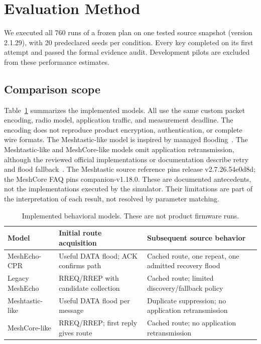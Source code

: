 \section{Evaluation Method}
\label{sec:evaluation}

We executed all 760 runs of a frozen plan on one tested source snapshot
(version 2.1.29), with 20 predeclared seeds per condition. Every key
completed on its first attempt and passed the formal evidence audit.
Development pilots are excluded from these performance estimates.

\subsection{Comparison scope}

Table~\ref{tab:models} summarizes the implemented models. All use the
same custom packet encoding, radio model, application traffic, and
measurement deadline. The encoding does not reproduce product encryption,
authentication, or complete wire formats. The Meshtastic-like model is
inspired by managed flooding~\cite{meshtasticdocs}. The Meshtastic-like and
MeshCore-like models omit application retransmission, although the
reviewed official implementations or documentation describe retry and
flood fallback~\cite{meshtasticfirmware,meshcore}. The Meshtastic source
reference pins release v2.7.26.54e0d8d; the MeshCore FAQ pins companion-v1.18.0.
These are documented antecedents, not the implementations executed by
the simulator. Their limitations are part
of the interpretation of each result, not resolved by parameter matching.

\begin{table}[t]
\caption{Implemented behavioral models. These are not product firmware runs.}
\label{tab:models}
\centering
\small
\setlength{\tabcolsep}{3pt}
\begin{tabular}{@{}>{\raggedright\arraybackslash}p{}>{\raggedright\arraybackslash}p{}>{\raggedright\arraybackslash}p{}@{}}
\toprule
Model & Initial route acquisition & Subsequent source behavior \\
\midrule
MeshEcho-CPR & Useful DATA flood; ACK confirms path & Cached route, one repeat, one admitted recovery flood \\
Legacy MeshEcho & RREQ/RREP with candidate collection & Cached route; limited discovery/fallback policy \\
Meshtastic-like & Useful DATA flood per message & Duplicate suppression; no application retransmission \\
MeshCore-like & RREQ/RREP; first reply gives route & Cached route; no application retransmission \\
\bottomrule
\end{tabular}
\end{table}

